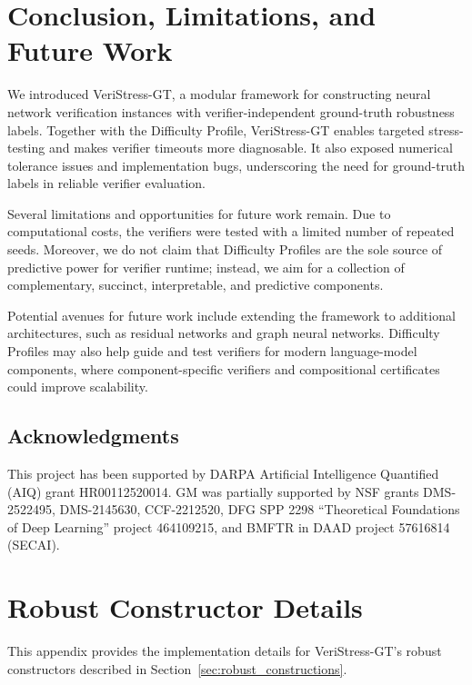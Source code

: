 \documentclass{article}
\theoremstyle{definition}
\begin{document}
\section{Conclusion, Limitations, and Future Work}
We introduced VeriStress-GT, a modular framework for constructing neural network verification instances with verifier-independent ground-truth robustness labels. Together with the Difficulty Profile, VeriStress-GT enables targeted stress-testing and makes verifier timeouts more diagnosable. It also exposed numerical tolerance issues and implementation bugs, underscoring the need for ground-truth labels in reliable verifier evaluation. 

Several limitations and opportunities for future work remain. 
Due to computational costs, the verifiers were tested with a limited number of repeated seeds. Moreover, we do not claim that Difficulty Profiles are the sole source of predictive power for verifier runtime; instead, we aim for a collection of complementary, succinct, interpretable, and predictive components. 

Potential avenues for future work include extending the framework to additional architectures, such as residual networks and graph neural networks. 
Difficulty Profiles may also help guide and test verifiers for modern language-model components, where component-specific verifiers and compositional certificates could improve scalability. 

\subsection*{Acknowledgments} 
This project has been supported by 
DARPA Artificial Intelligence Quantified (AIQ) grant HR00112520014.  
%
GM was partially supported by 
NSF grants 
DMS-2522495, 
DMS-2145630, 
CCF-2212520, 
DFG SPP 2298 ``Theoretical Foundations of Deep Learning'' project 464109215,  
and BMFTR in DAAD project 57616814 (SECAI). 


\newpage 




\appendix 
\newpage 


\section{Robust Constructor Details}
\label{app:constructor_details}

This appendix provides the implementation details for VeriStress-GT's robust constructors described in Section~\ref{sec:robust_constructions}.
\end{document}
